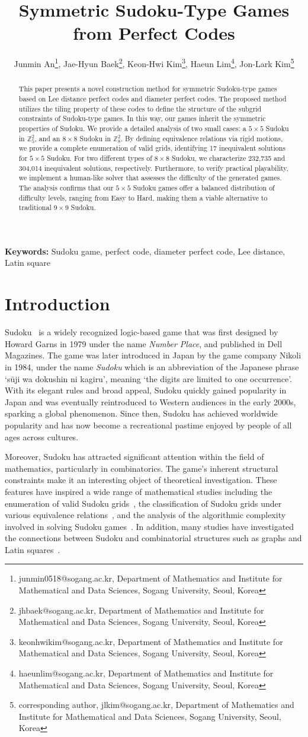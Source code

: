 \documentclass{article}
\title{Symmetric Sudoku-Type Games from Perfect Codes}
\author{Junmin An\thanks{junmin0518@sogang.ac.kr, Department of Mathematics and Institute for Mathematical and Data Sciences, Sogang University, Seoul, Korea}, Jae-Hyun Baek\thanks{jhbaek@sogang.ac.kr, Department of Mathematics and Institute for Mathematical and Data Sciences, Sogang University, Seoul, Korea}, Keon-Hwi Kim\thanks{keonhwikim@sogang.ac.kr, Department of Mathematics and Institute for Mathematical and Data Sciences, Sogang University, Seoul, Korea}, Haeun Lim\thanks{haeunlim@sogang.ac.kr, Department of Mathematics and Institute for Mathematical and Data Sciences, Sogang University, Seoul, Korea}, Jon-Lark Kim\thanks{corresponding author, jlkim@sogang.ac.kr, Department of Mathematics and Institute for Mathematical and Data Sciences, Sogang University, Seoul, Korea}}
\date{}
\theoremstyle{definition}
\begin{document}
\maketitle

\begin{abstract}
This paper presents a novel construction method for symmetric Sudoku-type games based on Lee distance perfect codes and diameter perfect codes. The proposed method utilizes the tiling property of these codes to define the structure of the subgrid constraints of Sudoku-type games. In this way, our games inherit the symmetric properties of Sudoku. We provide a detailed analysis of two small cases: a $5 \times 5$ Sudoku in $\mathbb{Z}_5^2$, and an $8 \times 8$ Sudoku in $\mathbb{Z}_8^2$. By defining equivalence relations via rigid motions, we provide a complete enumeration of valid grids, identifying 17 inequivalent solutions for $5\times 5$ Sudoku. For two different types of $8\times 8$ Sudoku, we characterize 232,735 and 304,014 inequivalent solutions, respectively. Furthermore, to verify practical playability, we implement a human-like solver that assesses the difficulty of the generated games. The analysis confirms that our $5\times5$ Sudoku games offer a balanced distribution of difficulty levels, ranging from Easy to Hard, making them a viable alternative to traditional $9 \times 9$ Sudoku.
\end{abstract}
\noindent\textbf{Keywords:} Sudoku game, perfect code, diameter perfect code, Lee distance, Latin square

\section{Introduction}
Sudoku~\cite{B07,D06} is a widely recognized logic-based game that was first designed by Howard Garns in 1979 under the name \textit{Number Place}, and published in Dell Magazines. The game was later introduced in Japan by the game company Nikoli in 1984, under the name \textit{Sudoku} which is an abbreviation of the Japanese phrase `s\={u}ji wa dokushin ni kagiru', meaning `the digits are limited to one occurrence'. With its elegant rules and broad appeal, Sudoku quickly gained popularity in Japan and was eventually reintroduced to Western audiences in the early 2000s, sparking a global phenomenon. Since then, Sudoku has achieved worldwide popularity and has now become a recreational pastime enjoyed by people of all ages across cultures.

Moreover, Sudoku has attracted significant attention within the field of mathematics, particularly in combinatorics. The game's inherent structural constraints make it an interesting object of theoretical investigation. These features have inspired a wide range of mathematical studies including the enumeration of valid Sudoku grids~\cite{FJ06}, the classification of Sudoku grids under various equivalence relations~\cite{RJ06}, and the analysis of the algorithmic complexity involved in solving Sudoku games~\cite{YS03}. In addition, many studies have investigated the connections between Sudoku and combinatorial structures such as graphs and Latin squares~\cite{BCC08, KSU23}.
\end{document}
